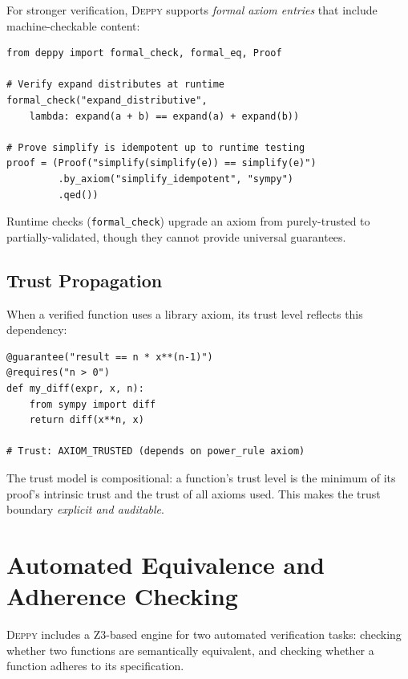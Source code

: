 \documentclass[acmsmall,nonacm,screen]{acmart}
\newcommand{\deppy}{\textsc{Deppy}}
\begin{document}
For stronger verification, \deppy{} supports \emph{formal axiom
  entries} that include machine-checkable content:

\begin{lstlisting}[language=deppy]
from deppy import formal_check, formal_eq, Proof

# Verify expand distributes at runtime
formal_check("expand_distributive",
    lambda: expand(a + b) == expand(a) + expand(b))

# Prove simplify is idempotent up to runtime testing
proof = (Proof("simplify(simplify(e)) == simplify(e)")
         .by_axiom("simplify_idempotent", "sympy")
         .qed())
\end{lstlisting}

Runtime checks (\texttt{formal\_check}) upgrade an axiom from
purely-trusted to partially-validated, though they cannot provide
universal guarantees.

\subsection{Trust Propagation}

When a verified function uses a library axiom, its trust level
reflects this dependency:

\begin{lstlisting}[language=deppy]
@guarantee("result == n * x**(n-1)")
@requires("n > 0")
def my_diff(expr, x, n):
    from sympy import diff
    return diff(x**n, x)

# Trust: AXIOM_TRUSTED (depends on power_rule axiom)
\end{lstlisting}

The trust model is compositional: a function's trust level is the
minimum of its proof's intrinsic trust and the trust of all axioms
used.  This makes the trust boundary \emph{explicit and auditable}.



\section{Automated Equivalence and Adherence Checking}\label{sec:equiv}

\deppy{} includes a Z3-based engine for two automated verification
tasks: checking whether two functions are semantically equivalent, and
checking whether a function adheres to its specification.
\end{document}
